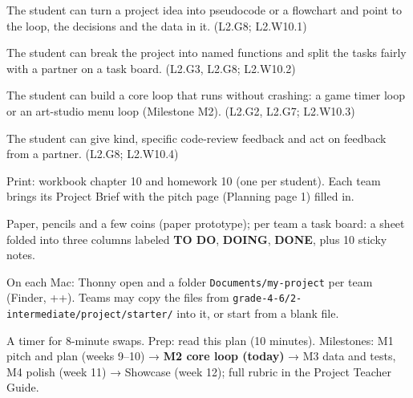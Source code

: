 
\begin{objectives}
  \item The student can turn a project idea into pseudocode or a flowchart and point to the loop, the decisions and the data in it. (L2.G8; L2.W10.1)
  \item The student can break the project into named functions and split the tasks fairly with a partner on a task board. (L2.G3, L2.G8; L2.W10.2)
  \item The student can build a core loop that runs without crashing: a game timer loop or an art-studio menu loop (Milestone M2). (L2.G2, L2.G7; L2.W10.3)
  \item The student can give kind, specific code-review feedback and act on feedback from a partner. (L2.G8; L2.W10.4)
\end{objectives}

\begin{materials}
  \item Print: workbook chapter 10 and homework 10 (one per student). Each team brings its Project Brief with the pitch page (Planning page 1) filled in.
  \item Paper, pencils and a few coins (paper prototype); per team a task board: a sheet folded into three columns labeled \textbf{TO DO}, \textbf{DOING}, \textbf{DONE}, plus 10 sticky notes.
  \item On each Mac: Thonny open and a folder \texttt{Documents/my-project} per team (Finder, ++). Teams may copy the files from \texttt{grade-4-6/2-intermediate/project/starter/} into it, or start from a blank file.
  \item A timer for 8-minute swaps. Prep: read this plan (10 minutes). Milestones: M1 pitch and plan (weeks 9--10) → \textbf{M2 core loop (today)} → M3 data and tests, M4 polish (week 11) → Showcase (week 12); full rubric in the Project Teacher Guide.
\end{materials}

